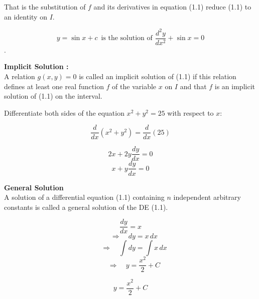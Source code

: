 \documentclass[a4aper,12pt]{report}
\begin{document}
That is the substitution of $f$ and its derivatives in equation (1.1) reduce (1.1) to an identity on $I$.
\begin{tcolorbox}[breakable, title=\textbf{Example 1.1: }]
     $$y=\sin x +c \,\,\, \text{is the solution of } \dfrac{d^2y}{dx^2}+\sin x=0$$.
     \vspace*{-5pt}
\end{tcolorbox}
\vspace*{5pt}
\noindent \textbf{Implicit Solution : } \\ [5pt]
A relation  $g(x,y)=0$ is called an implicit solution of (1.1) if this relation defines at least one real function $f$ of the variable $x$ on $I$ and that $f$ is an implicit  solution of (1.1) on the interval.
\begin{tcolorbox}[breakable,
    title={\textbf{Example 1.2: }The relation $x^2+y^2=25$ is an implicit solution of differential equation $x+y\dfrac{dy}{dx}=0$}
]
Differentiate both sides of the equation \( x^2 + y^2 = 25 \) with respect to \( x \):

\[
\frac{d}{dx}(x^2 + y^2) = \frac{d}{dx}(25)
\]

\[
2x + 2y \frac{dy}{dx} = 0
\] 
\[
x+y\dfrac{dy}{dx}=0
\]
\end{tcolorbox}
\noindent\textbf{General Solution} \\ [5pt]
A solution of a differential equation (1.1) containing \( n \) independent arbitrary constants is called a general solution of the DE (1.1).

\[
\frac{dy}{dx} = x
\]
\[
\quad \Rightarrow \quad dy = x\,dx
\]
\[\quad \Rightarrow \quad \int dy = \int x\,dx
\]
\[
\quad \Rightarrow \quad y = \frac{x^2}{2} + C
\]

\begin{tcolorbox}[breakable, title = {\textbf{Example 1.3: }For the equation \( \frac{dy}{dx} = x \),find the general solution}]
\[
y = \frac{x^2}{2} + C
\]   
\end{tcolorbox}


\end{document}

